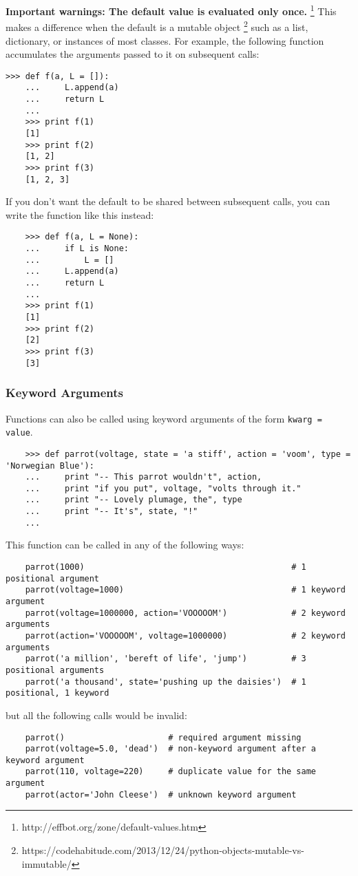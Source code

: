 \documentclass[UTF8]{article}
\begin{document}
\textbf{Important warnings: The default value is evaluated only once.}
\footnote{http://effbot.org/zone/default-values.htm} This makes a difference when
the default is a mutable object
\footnote{https://codehabitude.com/2013/12/24/python-objects-mutable-vs-immutable/}
such as a list, dictionary, or instances of most classes. For example, the following function
accumulates the arguments passed to it on subsequent calls:
\begin{verbatim}
>>> def f(a, L = []):
    ...     L.append(a)
    ...     return L
    ...
    >>> print f(1)
    [1]
    >>> print f(2)
    [1, 2]
    >>> print f(3)
    [1, 2, 3]
\end{verbatim}

If you don't want the default to be shared between subsequent calls, you can write the function
like this instead:
\begin{verbatim}
    >>> def f(a, L = None):
    ...     if L is None:
    ...         L = []
    ...     L.append(a)
    ...     return L
    ...
    >>> print f(1)
    [1]
    >>> print f(2)
    [2]
    >>> print f(3)
    [3]
\end{verbatim}

\subsubsection{Keyword Arguments}
Functions can also be called using keyword arguments of the form \texttt{kwarg = value}.

\begin{verbatim}
    >>> def parrot(voltage, state = 'a stiff', action = 'voom', type = 'Norwegian Blue'):
    ...     print "-- This parrot wouldn't", action,
    ...     print "if you put", voltage, "volts through it."
    ...     print "-- Lovely plumage, the", type
    ...     print "-- It's", state, "!"
    ...
\end{verbatim}

This function can be called in any of the following ways:
\begin{verbatim}
    parrot(1000)                                          # 1 positional argument
    parrot(voltage=1000)                                  # 1 keyword argument
    parrot(voltage=1000000, action='VOOOOOM')             # 2 keyword arguments
    parrot(action='VOOOOOM', voltage=1000000)             # 2 keyword arguments
    parrot('a million', 'bereft of life', 'jump')         # 3 positional arguments
    parrot('a thousand', state='pushing up the daisies')  # 1 positional, 1 keyword
\end{verbatim}
but all the following calls would be invalid:
\begin{verbatim}
    parrot()                     # required argument missing
    parrot(voltage=5.0, 'dead')  # non-keyword argument after a keyword argument
    parrot(110, voltage=220)     # duplicate value for the same argument
    parrot(actor='John Cleese')  # unknown keyword argument
\end{verbatim}
\end{document}
